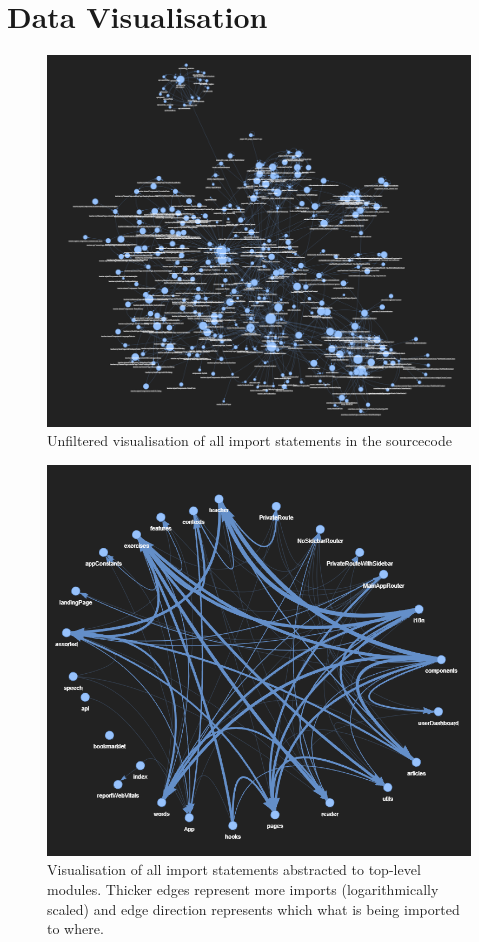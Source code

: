 \documentclass{article}
\begin{document}
\clearpage
\section{Data Visualisation}
\label{apx:d}

\begin{figure}[h]
\includegraphics[width=\textwidth]{graphics/raw_imports.png}
\caption{Unfiltered visualisation of all import statements in the sourcecode}
\label{fig:d:raw}
\end{figure}

\begin{figure}[h]
\includegraphics[width=\textwidth]{graphics/module_abstraction_dirty.png}
\caption{Visualisation of all import statements abstracted to top-level modules. 
Thicker edges represent more imports (logarithmically scaled) and edge 
direction represents which what is being imported to where.}
\label{fig:d:abs}
\end{figure}
\end{document}
